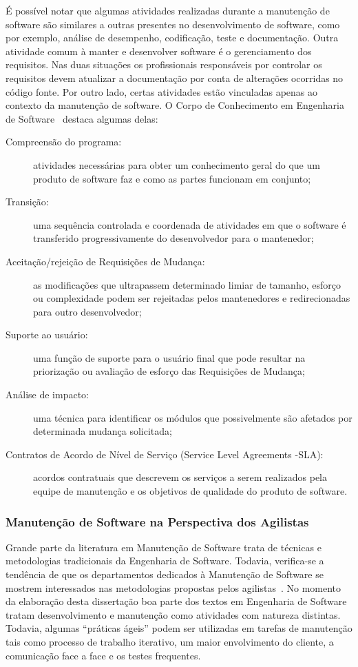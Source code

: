 É possível notar que algumas atividades realizadas durante a manutenção de
software são similares a outras presentes no desenvolvimento de software, como
por exemplo, análise de desempenho, codificação, teste e documentação. Outra
atividade comum à manter e desenvolver software é o gerenciamento dos
requisitos. Nas duas situações os profissionais responsáveis por controlar os
requisitos devem atualizar a do\-cu\-men\-ta\-ção  por conta de alterações
ocorridas no código fonte. Por outro lado, certas atividades estão vinculadas
apenas ao contexto da manutenção de software. O Corpo de Conhecimento em
Engenharia de Software~\cite{4425813} destaca algumas delas:

\begin{description}
	\item[Compreensão do programa:] atividades necessárias para obter um
		conhecimento geral do que um produto de software faz e como as partes
		funcionam em conjunto;
    \item[Transição:] uma sequência controlada e coordenada de atividades em que
        o software é transferido progressivamente do desenvolvedor para o
        mantenedor;
    \item[Aceitação/rejeição de Requisições de Mudança:] as modificações que
        ultrapassem determinado limiar de tamanho, esforço ou complexidade podem
        ser rejeitadas pelos mantenedores e redirecionadas para outro
        desenvolvedor;
	\item[Suporte ao usuário:] uma função de suporte para o usuário final que
		pode resultar na priorização ou avaliação de esforço das Requisições
		de Mudança;
	\item[Análise de impacto:] uma técnica para identificar os módulos que
		possivelmente são afetados por determinada mudança solicitada;
	\item[Contratos de Acordo de Nível de Serviço (Service Level Agreements
		\@-\@ SLA):] acordos contratuais que descrevem os serviços a serem
		realizados pela equipe de manutenção e os objetivos de qualidade do
		produto de software.
\end{description}

\subsubsection{Manutenção de Software na Perspectiva dos Agilistas}
\label{sub:manutenção_de_software_com_método_dos_agilistas}

Grande parte da literatura em Manutenção de Software trata de técnicas e
metodologias tradicionais da Engenharia de Software. Todavia, verifica-se a
tendência de que os departamentos dedicados à Manutenção de Software se mostrem
interessados nas metodologias propostas pelos agilistas~\cite{Heeager2015}.  No
momento da elaboração desta dissertação boa parte dos textos em Engenharia de
Software tratam desenvolvimento e manutenção como atividades com natureza
distintas. Todavia, algumas ``práticas ágeis'' podem ser utilizadas em tarefas
de manutenção tais como processo de trabalho iterativo, um maior envolvimento do
cliente, a comunicação face a face e os testes frequentes.

